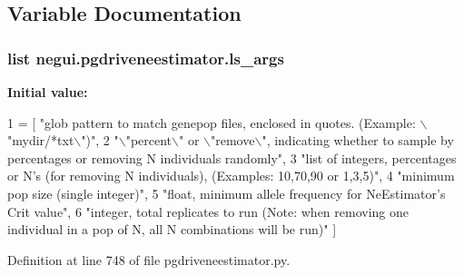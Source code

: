 \subsection{Variable Documentation}
\subsubsection[{\texorpdfstring{ls\+\_\+args}{ls_args}}]{\setlength{\rightskip}{0pt plus 5cm}list negui.\+pgdriveneestimator.\+ls\+\_\+args}\hypertarget{namespacenegui_1_1pgdriveneestimator_abfbdb01853ee7510bfe0276c609515d1}{}\label{namespacenegui_1_1pgdriveneestimator_abfbdb01853ee7510bfe0276c609515d1}
{\bfseries Initial value\+:}
\begin{DoxyCode}
1 = [ \textcolor{stringliteral}{"glob pattern to match genepop files, enclosed in quotes. (Example: \(\backslash\)"mydir/*txt\(\backslash\)")"}, 
2             \textcolor{stringliteral}{"\(\backslash\)"percent\(\backslash\)" or \(\backslash\)"remove\(\backslash\)", indicating whether to sample by percentages or removing N
       individuals randomly"},
3             \textcolor{stringliteral}{"list of integers, percentages or N's (for removing N individuals),  (Examples: 10,70,90 or
       1,3,5)"}, 
4             \textcolor{stringliteral}{"minimum pop size (single integer)"},
5             \textcolor{stringliteral}{"float, minimum allele frequency for NeEstimator's Crit value"},
6             \textcolor{stringliteral}{"integer, total replicates to run (Note: when removing one individual in a pop of N, all N
       combinations will be run)"} ]
\end{DoxyCode}


Definition at line 748 of file pgdriveneestimator.\+py.

